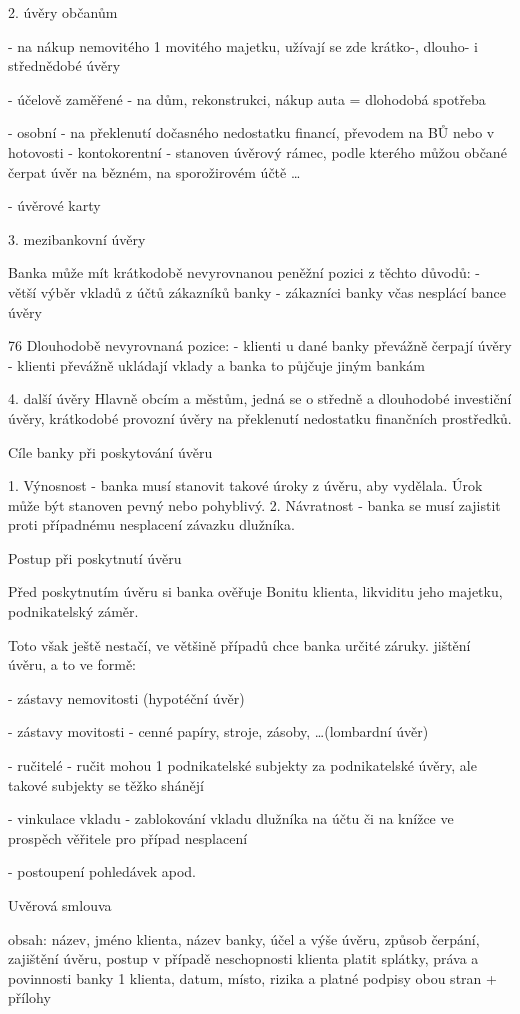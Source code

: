 2. úvěry občanům

- na nákup nemovitého 1 movitého majetku, užívají se zde krátko-, dlouho- i střednědobé
úvěry

- účelově zaměřené - na dům, rekonstrukci, nákup auta = dlohodobá spotřeba

- osobní - na překlenutí dočasného nedostatku financí, převodem na BŮ nebo v hotovosti
- kontokorentní - stanoven úvěrový rámec, podle kterého můžou občané čerpat úvěr na
bězném, na sporožirovém účtě \ldots

- úvěrové karty

3. mezibankovní úvěry

Banka může mít krátkodobě nevyrovnanou peněžní pozici z těchto důvodů:
- větší výběr vkladů z účtů zákazníků banky
- zákazníci banky včas nesplácí bance úvěry

76
\newpage
Dlouhodobě nevyrovnaná pozice:
- klienti u dané banky převážně čerpají úvěry
- klienti převážně ukládají vklady a banka to půjčuje jiným bankám

4. další úvěry
Hlavně obcím a městům, jedná se o středně a dlouhodobé investiční úvěry, krátkodobé
provozní úvěry na překlenutí nedostatku finančních prostředků.

Cíle banky při poskytování úvěru

1. Výnosnost - banka musí stanovit takové úroky z úvěru, aby vydělala. Úrok může být
stanoven pevný nebo pohyblivý.
2. Návratnost - banka se musí zajistit proti případnému nesplacení závazku dlužníka.

Postup při poskytnutí úvěru

Před poskytnutím úvěru si banka ověřuje Bonitu klienta, likviditu jeho majetku, podnikatelský
záměr.

Toto však ještě nestačí, ve většině případů chce banka určité záruky. jištění úvěru, a to ve
formě:

- zástavy nemovitosti (hypotéční úvěr)

- zástavy movitosti - cenné papíry, stroje, zásoby, \ldots (lombardní úvěr)

- ručitelé - ručit mohou 1 podnikatelské subjekty za podnikatelské úvěry, ale takové subjekty
se těžko shánějí

- vinkulace vkladu - zablokování vkladu dlužníka na účtu či na knížce ve prospěch věřitele
pro případ nesplacení

- postoupení pohledávek apod.

Uvěrová smlouva

obsah: název, jméno klienta, název banky, účel a výše úvěru, způsob čerpání, zajištění úvěru,
postup v případě neschopnosti klienta platit splátky, práva a povinnosti banky 1 klienta,
datum, místo, rizika a platné podpisy obou stran + přílohy

